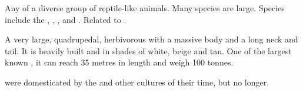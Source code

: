 \begin{gloss}







\begin{comment}
\paragraph{\saurian}
\end{comment}
\gitem{\saurian}
Any of a diverse group of reptile-like animals. 
Many species are large. 
Species include the , , ,  and . 
Related to . 








\begin{comment}
\paragraph{\tondra}
\end{comment}
\gitem{\tondra}
A very large, quadrupedal, herbivorous  with a massive body and a long neck and tail. 
It is heavily built and \coloured in shades of white, beige and tan. 
One of the largest known \saurians, it can reach 35 metres in length and weigh 100 tonnes. 

\Tondras{} were domesticated by the  and other cultures of their time, but no longer. 




\end{gloss}



















